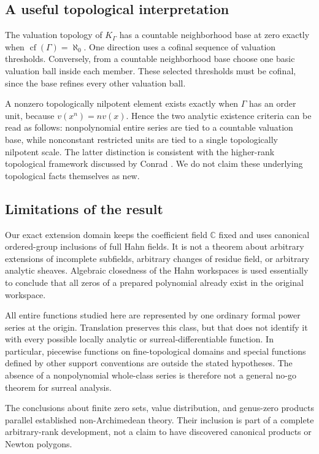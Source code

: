 \documentclass[11pt,letterpaper]{article}
\numberwithin{equation}{section}
\theoremstyle{definition}
\theoremstyle{remark}
\newcommand{\C}{\mathbb C}
\newcommand{\cf}{\operatorname{cf}}
\begin{document}
\subsection{A useful topological interpretation}
The valuation topology of $K_\Gamma$ has a countable neighborhood base at zero
exactly when $\cf(\Gamma)=\aleph_0$. One direction uses a cofinal sequence
of valuation thresholds. Conversely, from a countable neighborhood base choose
one basic valuation ball inside each member. These selected thresholds must
be cofinal, since the base refines every other valuation ball.

A nonzero topologically nilpotent element exists exactly when $\Gamma$ has
an order unit, because $v(x^n)=nv(x)$. Hence the two analytic existence
criteria can be read as follows: nonpolynomial entire series are tied to a
countable valuation base, while nonconstant restricted units are tied to a
single topologically nilpotent scale. The latter distinction is consistent
with the higher-rank topological framework discussed by Conrad \cite{Conrad}.
We do not claim these underlying topological facts themselves as new.

\subsection{Limitations of the result}
Our exact extension domain keeps the coefficient field $\C$ fixed and uses
canonical ordered-group inclusions of full Hahn fields. It is not a theorem
about arbitrary extensions of incomplete subfields, arbitrary changes of
residue field, or arbitrary analytic sheaves. Algebraic closedness of the
Hahn workspaces is used essentially to conclude that all zeros of a prepared
polynomial already exist in the original workspace.

All entire functions studied here are represented by one ordinary formal
power series at the origin. Translation preserves this class, but that does
not identify it with every possible locally analytic or surreal-differentiable
function. In particular, piecewise functions on fine-topological domains and
special functions defined by other support conventions are outside the stated
hypotheses. The absence of a nonpolynomial whole-class series is therefore
not a general no-go theorem for surreal analysis.

The conclusions about finite zero sets, value distribution, and genus-zero
products parallel established non-Archimedean theory. Their inclusion is part of a complete
arbitrary-rank development, not a claim to have discovered canonical products
or Newton polygons.
\end{document}

